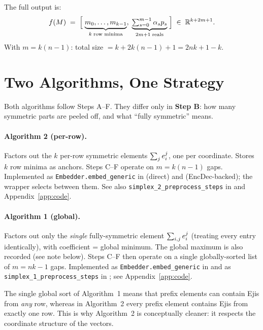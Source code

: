\noindent
The full output is:
\[
  f(M) \;=\; \Bigl[\;\underbrace{m_0,\ldots,m_{k-1}}_{k\;\text{row minima}},\;
                     \underbrace{\textstyle\sum_{s=0}^{m-1}\alpha_s p_s}_{2m+1\;\text{reals}}
             \;\Bigr]
  \;\in\; \mathbb{R}^{k + 2m + 1}.
\]
With $m = k(n-1)$: total size $= k + 2k(n-1) + 1 = 2nk+1-k$.

\section{Two Algorithms, One Strategy}
\label{sec:two-algs}

Both algorithms follow Steps A--F.  They differ only in \textbf{Step B}: how
many symmetric parts are peeled off, and what ``fully symmetric'' means.

\paragraph{Algorithm 2 (per-row).}
Factors out the $k$ per-row symmetric elements $\sum_j e^{j}_{i}$, one per
coordinate.  Stores $k$ row minima as anchors.  Steps C--F operate on
$m = k(n-1)$ gaps.
Implemented as \texttt{Embedder.embed\_generic} in \algtwoapy{} (direct) and
\algtwobpy{} (EncDec-backed); the \algtwopy{} wrapper selects between them.
See also \texttt{simplex\_2\_preprocess\_steps} in \encdecpy{} and
Appendix~\ref{app:code}.

\paragraph{Algorithm 1 (global).}
Factors out only the \emph{single} fully-symmetric element $\sum_{i,j}
e^{j}_{i}$ (treating every entry identically), with coefficient = global
minimum.  The global maximum is also recorded (see note below).  Steps C--F
then operate on a single globally-sorted list of $m = nk-1$ gaps.
Implemented as \texttt{Embedder.embed\_generic} in \algonepy{} and as
\texttt{simplex\_1\_preprocess\_steps} in \encdecpy{}; see
Appendix~\ref{app:code}.

The single global sort of Algorithm~1 means that prefix elements can contain
Ejis from \emph{any} row, whereas in Algorithm~2 every prefix element contains
Ejis from exactly one row.  This is why Algorithm~2 is conceptually cleaner:
it respects the coordinate structure of the vectors.

